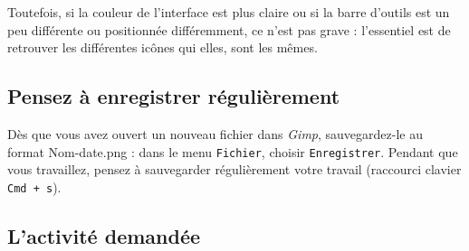 Toutefois, si la couleur de l'interface est plus claire ou si la barre d'outils est un peu différente ou positionnée différemment, ce n'est pas grave : l'essentiel est de retrouver les différentes icônes qui elles, sont les mêmes.

\subsection{Pensez à enregistrer régulièrement}

Dès que vous avez ouvert un nouveau fichier dans \emph{Gimp}, sauvegardez-le au format Nom-date.png : dans le menu \texttt{Fichier}, choisir \texttt{Enregistrer}. Pendant que vous travaillez, pensez à sauvegarder régulièrement votre travail (raccourci clavier \texttt{Cmd + s}).   


\vfill
\phantom{rien}

\subsection{L'activité demandée}

\vspace{10pt}

